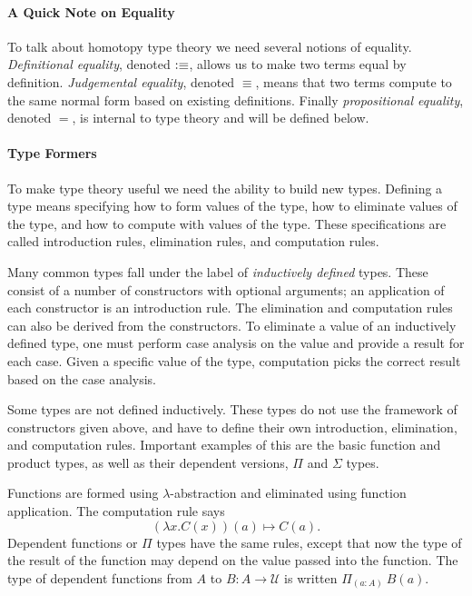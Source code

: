 \documentclass[12pt, parskip, DIV=14]{scrbook}
\newcommand{\defeq}{\vcentcolon\equiv}
\begin{document}
\paragraph{A Quick Note on Equality} To talk about homotopy type theory we need several notions of equality. \textit{Definitional equality}, denoted $\defeq$, allows us to make two terms equal by definition. \textit{Judgemental equality}, denoted $\equiv$, means that two terms compute to the same normal form based on existing definitions. Finally \textit{propositional equality}, denoted $=$, is internal to type theory and will be defined below.

\paragraph{Type Formers}

To make type theory useful we need the ability to build new types. Defining a type means specifying how to form values of the type, how to eliminate values of the type, and how to compute with values of the type. These specifications are called introduction rules, elimination rules, and computation rules.

Many common types fall under the label of \textit{inductively defined} types. These consist of a number of constructors with optional arguments; an application of each constructor is an introduction rule. The elimination and computation rules can also be derived from the constructors. To eliminate a value of an inductively defined type, one must perform case analysis on the value and provide a result for each case. Given a specific value of the type, computation picks the correct result based on the case analysis.

Some types are not defined inductively. These types do not use the framework of constructors given above, and have to define their own introduction, elimination, and computation rules. Important examples of this are the basic function and product types, as well as their dependent versions, $\Pi$ and $\Sigma$ types.

Functions are formed using $\lambda$-abstraction and eliminated using function application. The computation rule says $$(\lambda x . C(x))(a) \mapsto C(a).$$ Dependent functions or $\Pi$ types have the same rules, except that now the type of the result of the function may depend on the value passed into the function. The type of dependent functions from $A$ to $B : A \to \mathcal{U}$ is written $\Pi_{(a : A)}~B(a)$.
\end{document}
